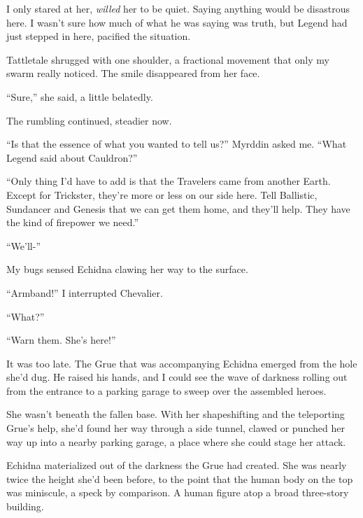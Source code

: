 I only stared at her, \emph{willed} her to be quiet.  Saying anything would be disastrous here.  I wasn't sure how much of what he was saying was truth, but Legend had just stepped in here, pacified the situation.



Tattletale shrugged with one shoulder, a fractional movement that only my swarm really noticed.  The smile disappeared from her face.



``Sure,'' she said, a little belatedly.



The rumbling continued, steadier now.



``Is that the essence of what you wanted to tell us?'' Myrddin asked me.  ``What Legend said about Cauldron?''



``Only thing I'd have to add is that the Travelers came from another Earth.  Except for Trickster, they're more or less on our side here.  Tell Ballistic, Sundancer and Genesis that we can get them home, and they'll help.  They have the kind of firepower we need.''



``We'll-''



My bugs sensed Echidna clawing her way to the surface.



``Armband!''  I interrupted Chevalier.



``What?''



``Warn them.  She's here!''



It was too late.  The Grue that was accompanying Echidna emerged from the hole she'd dug.  He raised his hands, and I could see the wave of darkness rolling out from the entrance to a parking garage to sweep over the assembled heroes.



She wasn't beneath the fallen base.  With her shapeshifting and the teleporting Grue's help, she'd found her way through a side tunnel, clawed or punched her way up into a nearby parking garage, a place where she could stage her attack.



Echidna materialized out of the darkness the Grue had created.  She was nearly twice the height she'd been before, to the point that the human body on the top was miniscule, a speck by comparison.  A human figure atop a broad three-story building.



